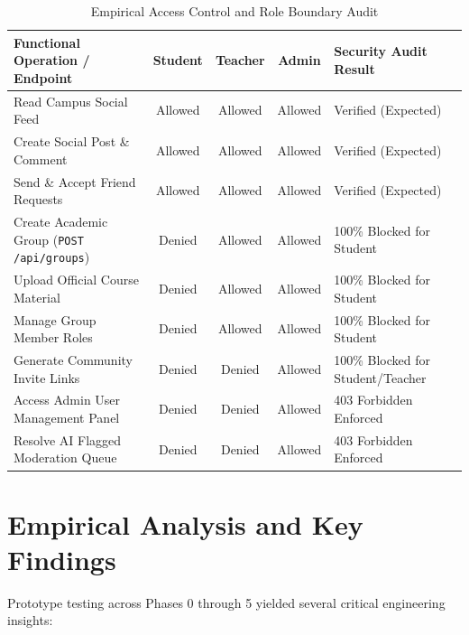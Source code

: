 \documentclass[11pt,a4paper]{report}
\begin{document}
\begin{table}[htbp]
\centering
\small
\begin{tabular}{@{}p{5.3cm}cccp{3cm}@{}}
\toprule
\textbf{Functional Operation / Endpoint} & \textbf{Student} & \textbf{Teacher} & \textbf{Admin} & \textbf{Security Audit Result} \\
\midrule
Read Campus Social Feed & Allowed & Allowed & Allowed & Verified (Expected) \\
Create Social Post \& Comment & Allowed & Allowed & Allowed & Verified (Expected) \\
Send \& Accept Friend Requests & Allowed & Allowed & Allowed & Verified (Expected) \\
Create Academic Group (\texttt{POST /api/groups}) & Denied & Allowed & Allowed & 100\% Blocked for Student \\
Upload Official Course Material & Denied & Allowed & Allowed & 100\% Blocked for Student \\
Manage Group Member Roles & Denied & Allowed & Allowed & 100\% Blocked for Student \\
Generate Community Invite Links & Denied & Denied & Allowed & 100\% Blocked for Student/Teacher \\
Access Admin User Management Panel & Denied & Denied & Allowed & 403 Forbidden Enforced \\
Resolve AI Flagged Moderation Queue & Denied & Denied & Allowed & 403 Forbidden Enforced \\
\bottomrule
\end{tabular}
\caption{Empirical Access Control and Role Boundary Audit}
\label{tab:rbac-audit}
\end{table}

\section{Empirical Analysis and Key Findings}

Prototype testing across Phases 0 through 5 yielded several critical engineering insights:
\end{document}
